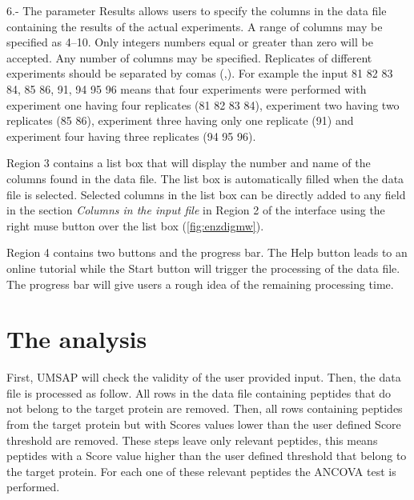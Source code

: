 \num{6}.- The parameter Results \label{par:results} allows users to specify the columns in the data file containing the results of the actual experiments. A range of columns may be specified as \numrange[range-phrase = --]{4}{10}. Only integers numbers equal or greater than zero will be accepted. Any number of columns may be specified. Replicates of different experiments should be separated by comas (,).  For example the input 81 82 83 84, 85 86, 91, 94 95 96 means that four experiments were performed with experiment one having four replicates (81 82 83 84), experiment two having two replicates (85 86), experiment three having only one replicate (91) and experiment four having three replicates (94 95 96).

Region \num{3} contains a list box that will display the number and name of the columns found in the data file. The list box is automatically filled when the data file is selected. Selected columns in the list box can be directly added to any field in the section \textit{Columns in the input file} in Region \num{2} of the interface using the right muse button over the list box (\autoref{fig:enzdigmw}).

Region \num{4} contains two buttons and the progress bar. The Help button leads to an online tutorial while the Start button will trigger the processing of the data file. The progress bar will give users a rough idea of the remaining processing time.

\section{The analysis}

First, UMSAP will check the validity of the user provided input. Then, the data file is processed as follow. All rows in the data file containing peptides that do not belong to the target protein are removed. Then, all rows containing peptides from the target protein but with Scores values lower than the user defined Score threshold are removed. These steps leave only relevant peptides, this means peptides with a Score value higher than the user defined threshold that belong to the target protein. For each one of these relevant peptides the ANCOVA test is performed. 

